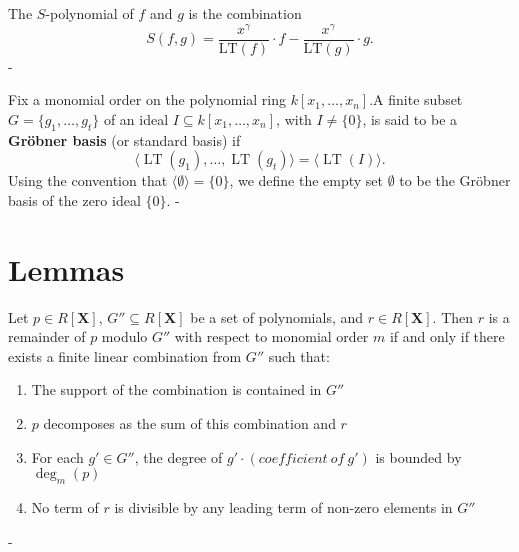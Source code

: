 \begin{definition}\label{MonomialOrder.sPolynomial}
  \leanok
  The $S$-polynomial of $f$ and $g$ is the combination
\[
S(f, g) = \frac{x^\gamma}{\mathrm{LT}(f)} \cdot f - \frac{x^\gamma}{\mathrm{LT}(g)} \cdot g.
\]
-
\end{definition}

\begin{definition}\label{MonomialOrder.IsGroebnerBasis}
  \leanok
  Fix a monomial order on the polynomial ring $k[x_1, \ldots, x_n]$.A finite subset $G = \{g_1, \ldots, g_t\}$ of an ideal $I \subseteq k[x_1, \ldots, x_n]$, with $I \ne \{0\}$, is said to be a \textbf{Gröbner basis} (or standard basis) if
\[
\langle \operatorname{LT}(g_1), \ldots, \operatorname{LT}(g_t) \rangle = \langle \operatorname{LT}(I) \rangle.
\]
Using the convention that $\langle \emptyset \rangle = \{0\}$, we define the empty set $\emptyset$ to be the Gröbner basis of the zero ideal $\{0\}$.
-
\end{definition}

\chapter{Lemmas}

\begin{lemma}\label{MonomialOrder.zero_le}
  \leanok

\end{lemma}

\begin{lemma}\label{MonomialOrder.IsRemainder_def'}
  \leanok
  Let $p \in R[\mathbf{X}]$, $G'' \subseteq R[\mathbf{X}]$ be a set of polynomials,
and $r \in R[\mathbf{X}]$. Then $r$ is a remainder of $p$ modulo $G''$ with respect to
monomial order $m$ if and only if there exists a finite linear combination from $G''$
such that:
\begin{enumerate}
\item The support of the combination is contained in $G''$
\item $p$ decomposes as the sum of this combination and $r$
\item For each $g' \in G''$, the degree of $g' \cdot (coefficient\ of\ g')$
  is bounded by $\deg_m(p)$
\item No term of $r$ is divisible by any leading term of non-zero elements in $G''$
\end{enumerate}
-
\end{lemma}

